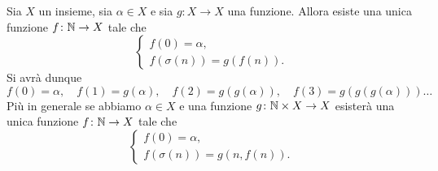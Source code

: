 
\begin{theorem}
  \label{th:induzione}%
  Sia $X$ un insieme, sia $\alpha\in X$ e sia $g\colon X\to X$ una funzione.
  Allora esiste una unica funzione $f\colon {\mathbb N} \to X$ tale che
  \begin{equation}\label{eq:4835628}
    \begin{cases}
      f(0) = \alpha, \\
      f(\sigma(n)) = g(f(n)).
    \end{cases}
  \end{equation}
  Si avrà dunque
  \[
    f(0) = \alpha,\quad
    f(1) = g(\alpha),\quad
    f(2) = g(g(\alpha)),\quad
    f(3) = g(g(g(\alpha)))\dots
  \]
  Più in generale se abbiamo $\alpha\in X$ e una funzione $g\colon {\mathbb N} \times X \to X$
  esisterà una unica funzione $f\colon {\mathbb N} \to X$ tale che
  \begin{equation}
    \begin{cases}
      f(0) = \alpha, \\
      f(\sigma(n)) = g(n, f(n)).
    \end{cases}
  \end{equation}
\end{theorem}
%
